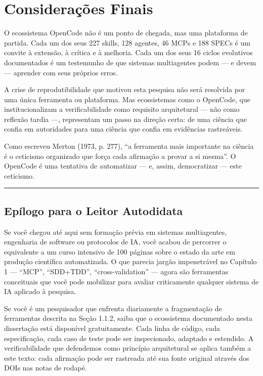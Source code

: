 \section{Considerações Finais}

O ecossistema OpenCode não é um ponto de chegada, mas uma plataforma de partida. Cada um dos seus 227 skills, 128 agentes, 46 MCPs e 188 SPECs é um convite à extensão, à crítica e à melhoria. Cada um dos seus 16 ciclos evolutivos documentados é um testemunho de que sistemas multiagentes podem --- e devem --- aprender com seus próprios erros.

A crise de reprodutibilidade que motivou esta pesquisa não será resolvida por uma única ferramenta ou plataforma. Mas ecossistemas como o OpenCode, que institucionalizam a verificabilidade como requisito arquitetural --- não como reflexão tardia ---, representam um passo na direção certa: de uma ciência que confia em autoridades para uma ciência que confia em evidências rastreáveis.

Como escreveu Merton (1973, p. 277), ``a ferramenta mais importante na ciência é o ceticismo organizado que força cada afirmação a provar a si mesma''. O OpenCode é uma tentativa de automatizar --- e, assim, democratizar --- este ceticismo.

\vspace{0.5cm}
\begin{center}
\rule{0.5\textwidth}{0.5pt}
\end{center}
\vspace{0.3cm}

\subsection*{Epílogo para o Leitor Autodidata}

Se você chegou até aqui sem formação prévia em sistemas multiagentes, engenharia de software ou protocolos de IA, você acabou de percorrer o equivalente a um curso intensivo de 100 páginas sobre o estado da arte em produção científica automatizada. O que parecia jargão impenetrável no Capítulo 1 --- ``MCP'', ``SDD+TDD'', ``cross-validation'' --- agora são ferramentas conceituais que você pode mobilizar para avaliar criticamente qualquer sistema de IA aplicado à pesquisa.

Se você é um pesquisador que enfrenta diariamente a fragmentação de ferramentas descrita na Seção 1.1.2, saiba que o ecossistema documentado nesta dissertação está disponível gratuitamente. Cada linha de código, cada especificação, cada caso de teste pode ser inspecionado, adaptado e estendido. A verificabilidade que defendemos como princípio arquitetural se aplica também a este texto: cada afirmação pode ser rastreada até sua fonte original através dos DOIs nas notas de rodapé.

